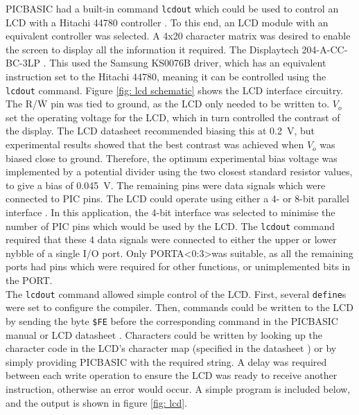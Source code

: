 PICBASIC had a built-in command \verb|lcdout| which could be used to control an LCD with a Hitachi 44780 controller \cite{picbasic_pro}. To this end, an LCD module with an equivalent controller was selected. A 4x20 character matrix was desired to enable the screen to display all the information it required. The Displaytech 204-A-CC-BC-3LP \cite{lcd}. This used the Samsung KS0076B driver, which has an equivalent instruction set to the Hitachi 44780, meaning it can be controlled using the \verb|lcdout| command. Figure \ref{fig: lcd schematic} shows the LCD interface circuitry. The R/$\overline{\text{W}}$ pin was tied to ground, as the LCD only needed to be written to. $V_o$ set the operating voltage for the LCD, which in turn controlled the contrast of the display. The LCD datasheet recommended biasing this at \SI{0.2}{\volt}, but experimental results showed that the best contrast was achieved when $V_o$ was biased close to ground. Therefore, the optimum experimental bias voltage was implemented by a potential divider using the two closest standard resistor values, to give a bias of \SI{0.045}{\volt}. The remaining pins were data signals which were connected to PIC pins. The LCD could operate using either a 4- or 8-bit parallel interface \cite{picbasic_pro}. In this application, the 4-bit interface was selected to minimise the number of PIC pins which would be used by the LCD. The \verb|lcdout| command required that these 4 data signals were connected to either the upper or lower nybble of a single I/O port. Only PORTA\textless0:3\textgreater was suitable, as all the remaining ports had pins which were required for other functions, or unimplemented bits in the PORT.\\

The \verb|lcdout| command allowed simple control of the LCD. First, several \verb|define|s were set to configure the compiler. Then, commands could be written to the LCD by sending the byte \verb|$FE| before the corresponding command in the PICBASIC manual \cite{picbasic_pro} or LCD datasheet \cite{lcd}. Characters could be written by looking up the character code in the LCD's character map (specified in the datasheet \cite{lcd}) or by simply providing PICBASIC with the required string. A delay was required between each write operation to ensure the LCD was ready to receive another instruction, otherwise an error would occur. A simple program is included below, and the output is shown in figure \ref{fig: lcd}.

